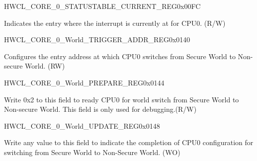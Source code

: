 \begin{register}{H}{WCL\_CORE\_0\_STATUSTABLE\_CURRENT\_REG}{0x{}00FC}\label{regdesc:WCLCORE0STATUSTABLECURRENTREG}
%
%
%
\regnewline%
\begin{regdesc}\begin{reglist}
\label{fielddesc:WCLCORE0STATUSTABLECURRENT}\item [WCL\_CORE\_0\_STATUSTABLE\_CURRENT] Indicates the entry where the interrupt is currently at for CPU0.  (R/W)
\end{reglist}\end{regdesc}
\end{register}




\begin{register}{H}{WCL\_CORE\_0\_World\_TRIGGER\_ADDR\_REG}{0x{}0140}\label{regdesc:WCLCORE0WORLDTRIGGERADDRREG}
%
\regnewline%
\begin{regdesc}\begin{reglist}
\label{fielddesc:WCLCORE0WORLDTRIGGERADDR}\item [WCL\_CORE\_0\_WORLD\_TRIGGER\_ADDR] Configures the entry address at which CPU0 switches from Secure World to Non-secure World. (RW)
\end{reglist}\end{regdesc}
\end{register}


\begin{register}{H}{WCL\_CORE\_0\_World\_PREPARE\_REG}{0x{}0144}\label{regdesc:WCLCORE0WORLDPREPAREREG}
%
%
\regnewline%
\begin{regdesc}\begin{reglist}
\label{fielddesc:WCLCORE0WORLDPREPARE}\item [WCL\_CORE\_0\_WORLD\_PREPARE] Write 0x{}2 to this field to ready CPU0 for world switch from Secure World to Non-secure World. This field is only used for debugging.(R/W)
\end{reglist}\end{regdesc}
\end{register}

\begin{register}{H}{WCL\_CORE\_0\_World\_UPDATE\_REG}{0x{}0148}\label{regdesc:WCLCORE0WORLDUPDATEREG}
%
\regnewline%
\begin{regdesc}\begin{reglist}
\label{fielddesc:WCLCORE0UPDATE}\item [WCL\_CORE\_0\_UPDATE] Write any value to this field to indicate the completion of CPU0 configuration for switching from Secure World to Non-Secure World. (WO)
\end{reglist}\end{regdesc}
\end{register}


